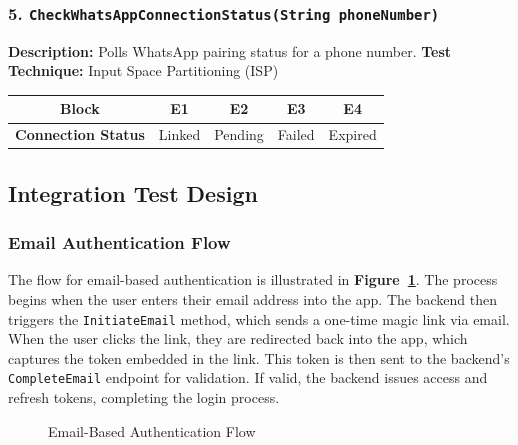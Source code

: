 \subsubsection*{5. \texttt{CheckWhatsAppConnectionStatus(String phoneNumber)}}

\textbf{Description:} Polls WhatsApp pairing status for a phone number.  
\textbf{Test Technique:} Input Space Partitioning (ISP)

\begin{table}[h!]
\centering
\begin{tabular}{|c|c|c|c|c|}
\hline
\textbf{Block} & \textbf{E1} & \textbf{E2} & \textbf{E3} & \textbf{E4} \\
\hline
\textbf{Connection Status} & Linked & Pending & Failed & Expired \\
\hline
\end{tabular}
\end{table}

\subsection{Integration Test Design}

\subsubsection*{Email Authentication Flow}

The flow for email-based authentication is illustrated in \textbf{Figure~\ref{fig:email-auth-flow}}. The process begins when the user enters their email address into the app. The backend then triggers the \texttt{InitiateEmail} method, which sends a one-time magic link via email. When the user clicks the link, they are redirected back into the app, which captures the token embedded in the link. This token is then sent to the backend's \texttt{CompleteEmail} endpoint for validation. If valid, the backend issues access and refresh tokens, completing the login process.

\begin{figure}[h!]
    \centering
    \caption{Email-Based Authentication Flow}
    \label{fig:email-auth-flow}
\end{figure}    

